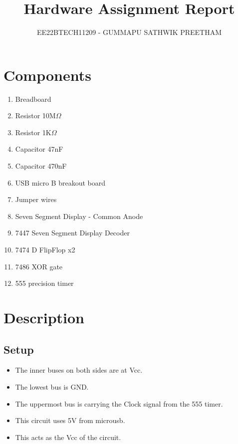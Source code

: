 \documentclass{article}
\begin{document}
\title{Hardware Assignment Report}
\author{EE22BTECH11209 -  GUMMAPU SATHWIK PREETHAM}
\date{}
\maketitle

\maketitle

\section{Components}
\begin{enumerate}
\item Breadboard
\item Resistor 10M$\Omega$
\item Resistor 1K$\Omega$
\item Capacitor 47nF
\item Capacitor 470nF
\item USB micro B breakout board
\item Jumper wires
\item Seven Segment Display - Common Anode
\item 7447 Seven Segment Display Decoder
\item 7474 D FlipFlop x2
\item 7486 XOR gate
\item 555 precision timer

\end{enumerate}
\section{Description}
\subsection{Setup}
\begin{itemize}
\item The inner buses on both sides are at Vcc. 
\item The lowest bus is GND. 
\item The uppermost bus is carrying the Clock signal from the 555 timer.
\item This circuit uses 5V from microusb.
\item This acts as the Vcc of the circuit. 

\end{itemize}
\end{document}
